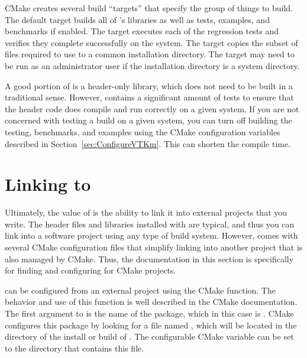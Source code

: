 CMake creates several build ``targets'' that specify the group of things to build.
The default target builds all of \VTKm's libraries as well as tests, examples, and benchmarks if enabled.
The  target executes each of the \VTKm regression tests and verifies they complete successfully on the system.
The  target copies the subset of files required to use \VTKm to a common installation directory.
The  target may need to be run as an administrator user if the installation directory is a system directory.

\begin{didyouknow}
  A good portion of \VTKm is a header-only library, which does not need to be built in a traditional sense.
  However, \VTKm contains a significant amount of tests to ensure that the header code does compile and run correctly on a given system.
  If you are not concerned with testing a build on a given system, you can turn off building the testing, benchmarks, and examples using the CMake configuration variables described in Section~\ref{sec:ConfigureVTKm}.
  This can shorten the \VTKm compile time.
\end{didyouknow}


\section{Linking to \VTKm}
\label{sec:LinkingToVTKm}

Ultimately, the value of \VTKm is the ability to link it into external projects that you write.
The header files and libraries installed with \VTKm are typical, and thus you can link \VTKm into a software project using any type of build system.
However, \VTKm comes with several CMake configuration files that simplify linking \VTKm into another project that is also managed by CMake.
Thus, the documentation in this section is specifically for finding and configuring \VTKm for CMake projects.


\VTKm can be configured from an external project using the  CMake function.
The behavior and use of this function is well described in the CMake documentation.
The first argument to  is the name of the package, which in this case is .
CMake configures this package by looking for a file named , which will be located in the  directory of the install or build of \VTKm.
The configurable CMake variable  can be set to the directory that contains this file.

